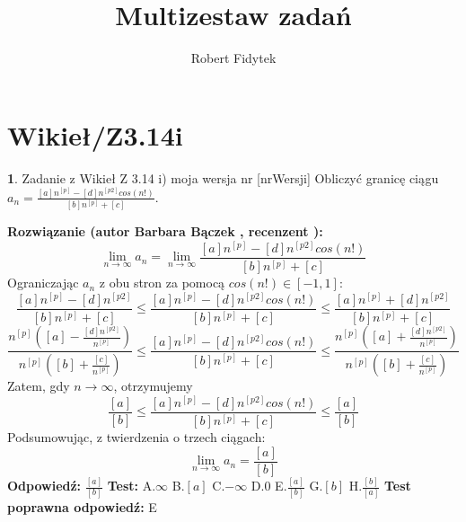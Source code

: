 \documentclass[12pt, a4paper]{article}
\title{Multizestaw zadań}
\author{Robert Fidytek}
\date{}
\theoremstyle{definition} %
\newtheorem{zad}{}
\newcommand{\kategoria}[1]{\section{#1}} %
\newcommand{\zadStart}[1]{\begin{zad}#1\newline} %
\newcommand{\zadStop}{\end{zad}}   %
\newcommand{\rozwStart}[2]{\noindent \textbf{Rozwiązanie (autor #1 , recenzent #2): }\newline} %
\newcommand{\rozwStop}{\newline}                                            %
\newcommand{\odpStart}{\noindent \textbf{Odpowiedź:}\newline}    %
\newcommand{\odpStop}{\newline}                                             %
\newcommand{\testStart}{\noindent \textbf{Test:}\newline} %
\newcommand{\testStop}{\newline} %
\newcommand{\kluczStart}{\noindent \textbf{Test poprawna odpowiedź:}\newline} %
\newcommand{\kluczStop}{\newline} %
\begin{document}
\maketitle


\kategoria{Wikieł/Z3.14i}
\zadStart{Zadanie z Wikieł Z 3.14 i) moja wersja nr [nrWersji]}
Obliczyć granicę ciągu $a_n= \frac{[a]n^{[p]} - [d]n^{[p2]}cos(n!)}{[b]n^{[p]}+[c]}$.
\zadStop
\rozwStart{Barbara Bączek}{}
$$\lim_{n \rightarrow \infty} a_n= \lim_{n \rightarrow \infty} \frac{[a]n^{[p]} - [d]n^{[p2]}cos(n!)}{[b]n^{[p]}+[c]}$$
Ograniczając $a_n$ z obu stron za pomocą $cos(n!) \in [-1,1]$:
$$ \frac{[a]n^{[p]} - [d]n^{[p2]}}{[b]n^{[p]}+[c]} \leq \frac{[a]n^{[p]} - [d]n^{[p2]}cos(n!)}{[b]n^{[p]}+[c]} \leq \frac{[a]n^{[p]} + [d]n^{[p2]}}{[b]n^{[p]}+[c]} $$
$$ \frac{n^{[p]}([a] - \frac{[d]n^{[p2]}}{n^{[p]}})}{n^{[p]}([b]+\frac{[c]}{n^{[p]}})} \leq \frac{[a]n^{[p]} - [d]n^{[p2]}cos(n!)}{[b]n^{[p]}+[c]}  \leq \frac{n^{[p]}([a] + \frac{[d]n^{[p2]}}{n^{[p]}})}{n^{[p]}([b]+\frac{[c]}{n^{[p]}})}$$
Zatem, gdy $n \rightarrow \infty$, otrzymujemy
$$ \frac{[a]}{[b]} \leq \frac{[a]n^{[p]} - [d]n^{[p2]}cos(n!)}{[b]n^{[p]}+[c]} \leq \frac{[a]}{[b]} $$
Podsumowując, z twierdzenia o trzech ciągach:  $$\lim_{n \rightarrow \infty} a_n= \frac{[a]}{[b]}$$
\rozwStop
\odpStart
$\frac{[a]}{[b]}$
\odpStop
\testStart
A.$\infty$
B.$[a]$
C.$-\infty$
D.$0$
E.$\frac{[a]}{[b]}$
G.$[b]$
H.$\frac{[b]}{[a]}$
\testStop
\kluczStart
E
\kluczStop
\end{document}
